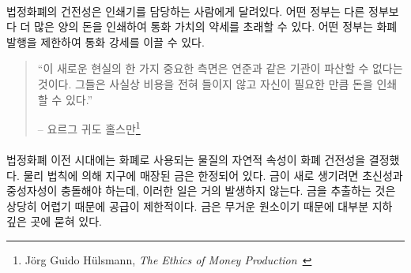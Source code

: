 \paragraph{}
\begin{comment}	
	The hardness of fiat currency depends on who is in charge of the
	respective printing presses. Some governments might be more willing to
	print large amounts of currency than others, resulting in a weaker
	currency. Other governments might be more restrictive in their money
	printing, resulting in harder currency.
\end{comment}
법정화폐의 건전성은 인쇄기를 담당하는 사람에게 달려있다. 
어떤 정부는 다른 정부보다 더 많은 양의 돈을 인쇄하여 통화 가치의 약세를 초래할 수 있다.
어떤 정부는 화폐 발행을 제한하여 통화 강세를 이끌 수 있다.


\begin{samepage}\begin{quotation}
		\begin{comment}	
			\enquote{One important aspect of this new reality is that institutions like
				the Fed cannot go bankrupt. They can print any amount of money that
				they might need for themselves at virtually zero cost.}
		\end{comment}
		\enquote{이 새로운 현실의 한 가지 중요한 측면은 연준과 같은 기관이 파산할 수 없다는 것이다. 
		그들은 사실상 비용을 전혀 들이지 않고 자신이 필요한 만큼 돈을 인쇄할 수 있다.}
		\begin{flushright} -- 요르그 귀도 홀스만\footnote{Jörg Guido Hülsmann, \textit{The
					Ethics of Money Production}~\cite{hulsmann2008ethics}}
\end{flushright}\end{quotation}\end{samepage}

\paragraph{}
\begin{comment}	
	Before we had fiat currencies, the soundness of money was determined by
	the natural properties of the stuff which we used as money. The amount
	of gold on earth is limited by the laws of physics. Gold is rare because
	supernovae and neutron star collisions are rare. The \enquote{flow} of gold is
	limited because extracting it is quite an effort. Being a heavy element
	it is mostly buried deep underground.
\end{comment}
법정화폐 이전 시대에는 화폐로 사용되는 물질의 자연적 속성이 화폐 건전성을 결정했다. 
물리 법칙에 의해 지구에 매장된 금은 한정되어 있다.
금이 새로 생기려면 초신성과 중성자성이 충돌해야 하는데, 이러한 일은 거의 발생하지 않는다.
금을 추출하는 것은 상당히 어렵기 때문에 공급이 제한적이다.
금은 무거운 원소이기 때문에 대부분 지하 깊은 곳에 묻혀 있다.

